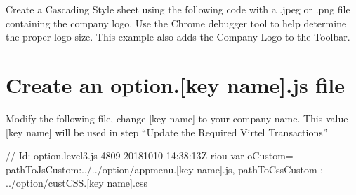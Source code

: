\documentclass[letterpaper,10pt,english]{sphinxmanual}
\begin{document}
\sphinxAtStartPar
Create a Cascading Style sheet using the following code with a .jpeg or .png file containing the company logo. Use the Chrome debugger tool to help determine the proper logo size. This example also adds the Company Logo to the Toolbar.

\begin{sphinxVerbatim}[commandchars=\\\{\}]
         
       
 
 
 
 
  
 
\end{sphinxVerbatim}


\section{Create an option.{[}key name{]}.js file}
\label{\detokenize{Customization:create-an-option-key-name-js-file}}
\sphinxAtStartPar
Modify the following file, change {[}key name{]} to your company name.  This value {[}key name{]}  will be used in step “Update the Required Virtel Transactions”

\begin{sphinxVerbatim}[commandchars=\\\{\}]
// \PYGZdl{}Id: option.level3.js 4809 2018\PYGZhy{}10\PYGZhy{}10 14:38:13Z riou \PYGZdl{}
var oCustom=\PYGZob{}
    \PYGZdq{}pathToJsCustom\PYGZdq{}:\PYGZdq{}../../option/appmenu.[key name].js\PYGZdq{},
    \PYGZdq{}pathToCssCustom\PYGZdq{} : \PYGZdq{}../option/custCSS.[key name].css\PYGZdq{}
    \PYGZcb{}
\end{sphinxVerbatim}
\end{document}
